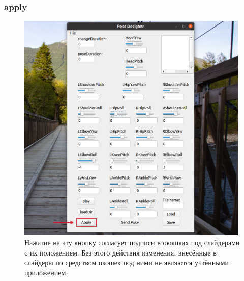 \documentclass[12pt,a4paper]{article}
\begin{document}
\subsubsection{apply}
\label{apply}
\begin{figure}[h!]
    \centering
    \includegraphics[width=0.99\textwidth]{images/apply.png}
    \caption{Нажатие на эту кнопку согласует подписи в окошках под слайдерами с их положением. Без этого действия изменения, внесённые в слайдеры по средством окошек под ними не являются учтёнными приложением.}
    \label{fig:file}
\end{figure}
\newpage
\end{document}
